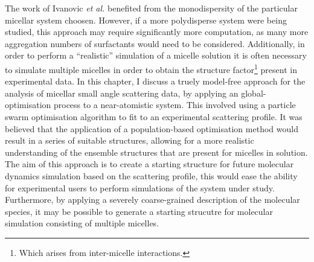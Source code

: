 The work of Ivanovic \emph{et al.} benefited from the monodispersity of the particular micellar system choosen.
However, if a more polydisperse system were being studied, this approach may require significantly more computation, as many more aggregation numbers of surfactants would need to be considered.
Additionally, in order to perform a ``realistic'' simulation of a micelle solution it is often necessary to simulate multiple micelles in order to obtain the structure factor\footnote{Which arises from inter-micelle interactions.} present in experimental data.
In this chapter, I discuss a truely model-free approach for the analysis of micellar small angle scattering data, by applying an global-optimisation process to a near-atomistic system.
This involved using a particle swarm optimisation algorithm to fit to an experimental scattering profile.
It was believed that the application of a population-based optimisation method would result in a series of suitable structures, allowing for a more realistic understanding of the ensemble structures that are present for micelles in solution.
The aim of this approach is to create a starting structure for future molecular dynamics simulation based on the scattering profile, this would ease the ability for experimental users to perform simulations of the system under study.
Furthermore, by applying a severely coarse-grained description of the molecular species, it may be possible to generate a starting strucutre for molecular simulation consisting of multiple micelles.
